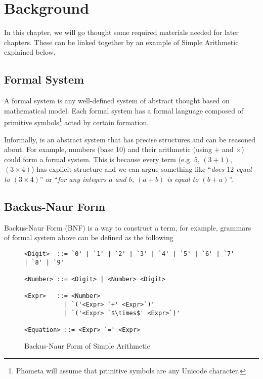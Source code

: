 \documentclass[master.tex]{subfiles}
\begin{document}
\chapter{Background}
\label{chap:background}

In this chapter, we will go thought some required materials needed for later
chapters. These can be linked together by an example of Simple Arithmetic
explained below.

\hspace{1ex}

\section{Formal System}

A formal system is any well-defined system of abstract thought based on
mathematical model\supercite{formal-system-wiki}. Each formal system has a
formal language composed of primitive symbols\footnote{Phometa will assume that
  primitive symbols are any Unicode character.} acted by certain
formation\supercite{formal-system-britannica}.

Informally, is an abstract system that has precise structures and can be
reasoned about. For example, numbers (base 10) and their arithmetic (using $+$
and $\times$) could form a formal system. This is because every term (e.g. $5$,
$(3 + 1)$, $(3 \times 4)$) has explicit structure and we can argue something
like ``\emph{does $12$ equal to $(3 \times 4)$}'' or ``\emph{for any integers
  $a$ and $b$, $(a + b)$ is equal to $(b + a)$}''.

\hspace{1ex}

\section{Backus-Naur Form}

Backus-Naur Form (BNF) is a way to construct a term, for example, grammars of
formal system above can be defined as the following

\hspace{1ex}

\begin{figure}[H]
\begin{framed}
\begin{lstlisting}[style=bnf]
<Digit>  ::= `0' | `1' | `2' | `3' | `4' | `5' | `6' | `7' | `8' | `9'

<Number> ::= <Digit> | <Number> <Digit>

<Expr>   ::= <Number>
           | `('<Expr> `+' <Expr>`)'
           | `('<Expr> `$\times$' <Expr>`)'

<Equation> ::= <Expr> `=' <Expr>
\end{lstlisting}
\end{framed}
\caption{Backus-Naur Form of Simple Arithmetic}
\label{fig:background-bnf}
\end{figure}
\end{document}
